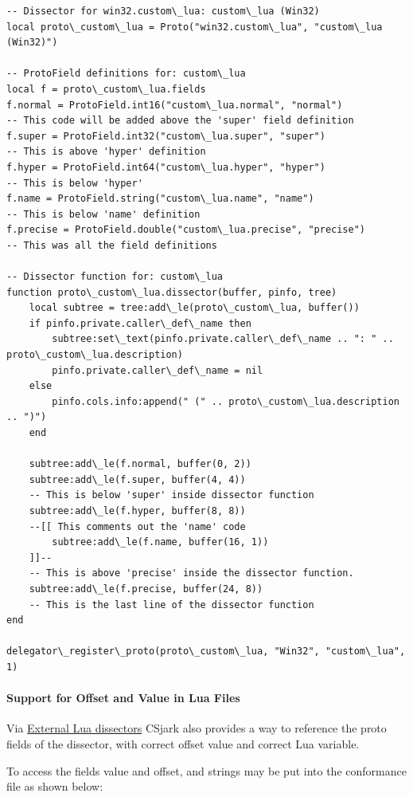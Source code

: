 \documentclass[A4paper,10pt,english]{sphinxmanual}
\begin{document}
\begin{Verbatim}[commandchars=\\\{\}]
-- Dissector for win32.custom\_lua: custom\_lua (Win32)
local proto\_custom\_lua = Proto("win32.custom\_lua", "custom\_lua (Win32)")

-- ProtoField definitions for: custom\_lua
local f = proto\_custom\_lua.fields
f.normal = ProtoField.int16("custom\_lua.normal", "normal")
-- This code will be added above the 'super' field definition
f.super = ProtoField.int32("custom\_lua.super", "super")
-- This is above 'hyper' definition
f.hyper = ProtoField.int64("custom\_lua.hyper", "hyper")
-- This is below 'hyper'
f.name = ProtoField.string("custom\_lua.name", "name")
-- This is below 'name' definition
f.precise = ProtoField.double("custom\_lua.precise", "precise")
-- This was all the field definitions

-- Dissector function for: custom\_lua
function proto\_custom\_lua.dissector(buffer, pinfo, tree)
    local subtree = tree:add\_le(proto\_custom\_lua, buffer())
    if pinfo.private.caller\_def\_name then
        subtree:set\_text(pinfo.private.caller\_def\_name .. ": " .. proto\_custom\_lua.description)
        pinfo.private.caller\_def\_name = nil
    else
        pinfo.cols.info:append(" (" .. proto\_custom\_lua.description .. ")")
    end

    subtree:add\_le(f.normal, buffer(0, 2))
    subtree:add\_le(f.super, buffer(4, 4))
    -- This is below 'super' inside dissector function
    subtree:add\_le(f.hyper, buffer(8, 8))
    --[[ This comments out the 'name' code
        subtree:add\_le(f.name, buffer(16, 1))
    ]]--
    -- This is above 'precise' inside the dissector function.
    subtree:add\_le(f.precise, buffer(24, 8))
    -- This is the last line of the dissector function
end

delegator\_register\_proto(proto\_custom\_lua, "Win32", "custom\_lua", 1)
\end{Verbatim}


\paragraph{Support for Offset and Value in Lua Files}
\label{user/config:support-for-offset-and-value-in-lua-files}
Via {\hyperref[user/config:external-lua-dissectors]{External Lua dissectors}} CSjark also provides a way to reference the proto fields of the dissector, with correct offset value and correct Lua variable.

To access the fields value and offset,  and  strings may be put into the conformance file as shown below:
\end{document}
